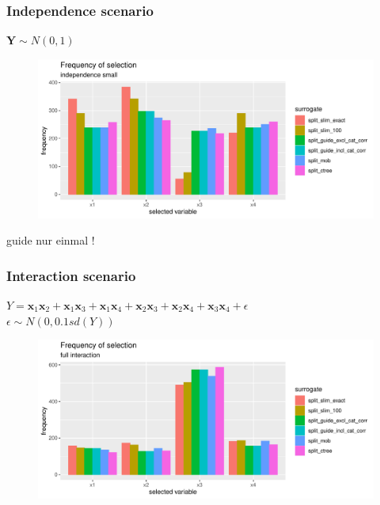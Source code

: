 \subsubsection{Independence scenario}
$\textbf{Y} \sim N(0,1)$
\begin{figure}
    \includegraphics[width=16cm]{Figures/simulations/batchtools/selection_bias_general_10_01/independence_small.pdf}
\end{figure}  
\color{blue} guide nur einmal !
\color{black}
\subsubsection{Interaction scenario}
$Y = \textbf{x}_1\textbf{x}_2 + \textbf{x}_1\textbf{x}_3 + \textbf{x}_1\textbf{x}_4 + \textbf{x}_2\textbf{x}_3 + \textbf{x}_2\textbf{x}_4 + \textbf{x}_3\textbf{x}_4 + \epsilon$ \\
$\epsilon \sim N(0,0.1sd(Y))$
\begin{figure}
    \includegraphics[width=16cm]{Figures/simulations/batchtools/selection_bias_general_10_01/full_interaction.pdf}
\end{figure}  

